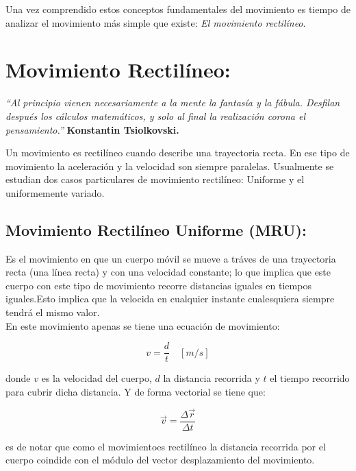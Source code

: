 \documentclass[a5paper,pagesize,10pt,bibtotoc,pointlessnumbers,
normalheadings,DIV=9,fleqn,x11names,table,twoside=false]{scrbook}
\begin{document}
Una vez comprendido estos conceptos fundamentales del movimiento es tiempo de analizar el movimiento más simple que existe: 
\textit{El movimiento rectilíneo}.


\chapter{Movimiento Rectilíneo:}

\textit{``Al principio vienen necesariamente a la mente la fantasía y la fábula. Desfilan después los cálculos matemáticos, y solo 
al final la realización corona el pensamiento.''} \textbf{Konstantin Tsiolkovski.} 
\vspace{1.0 cm}

Un movimiento es rectilíneo cuando describe una trayectoria recta. En ese tipo de movimiento la aceleración y la velocidad son 
siempre paralelas. Usualmente se estudian dos casos particulares de movimiento rectilíneo: Uniforme y el uniformemente variado.

\section{Movimiento Rectilíneo Uniforme (MRU):}
 
Es el movimiento en que un cuerpo móvil se mueve a tráves de una trayectoria recta (una línea recta) y con una velocidad 
constante; lo que implica que este cuerpo con este tipo de movimiento recorre distancias iguales en tiempos iguales.Esto implica 
que la velocida en cualquier instante cualesquiera siempre
 tendrá el mismo valor.\\

En este movimiento apenas se tiene una ecuación de movimiento:

\begin{equation}
 v = \frac{d}{t}\quad [m/s]
\end{equation}

donde $v$ es la velocidad del cuerpo, $d$ la distancia recorrida y $t$ el tiempo recorrido para cubrir dicha distancia. Y de 
forma vectorial se tiene que:

\begin{equation}
 \vec{v} = \frac{\Delta\vec{r}}{\Delta t}
\end{equation}

es de notar que como el movimientoes rectilíneo la distancia recorrida por el cuerpo coindide con el módulo del vector 
desplazamiento del movimiento.\\
 
\end{document}
